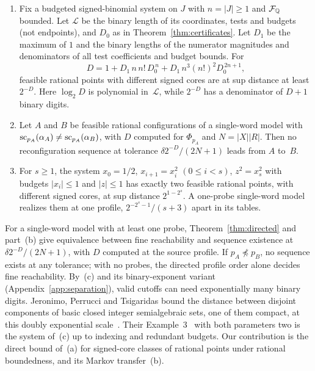 \begin{proposition}\label{prop:separation}
\begin{enumerate}
\item[(a)] Fix a budgeted signed-binomial system on $J$ with $n=|J|\ge1$
and $\mathcal F_{\mathbb{Q}}$ bounded. Let $\mathcal L$ be the binary length of its coordinates, tests
and budgets (not endpoints), and $D_0$ as in Theorem~\ref{thm:certificates}.
Let $D_1$ be the maximum of $1$ and the binary lengths of the numerator
magnitudes and denominators of all test coefficients and budget bounds.
For
\[
  D=1+D_1\,n\,n!\,D_0^{\,n}+D_1\,n^3(n!)^2D_0^{\,2n+1},
\]
feasible rational points with different signed cores are at sup distance
at least $2^{-D}$. Here $\log_2D$ is polynomial in~$\mathcal L$, while $2^{-D}$ has
a denominator of $D+1$ binary digits.
\item[(b)] Let $A$ and $B$ be feasible rational configurations of a
single-word model with $\operatorname{sc}_{p_A}(\alpha_A)\neq\operatorname{sc}_{p_A}(\alpha_B)$, with
$D$ computed for $\Phi_{p_A}$ and $N=|X||R|$. Then no reconfiguration
sequence at tolerance $\delta2^{-D}/(2N+1)$ leads from $A$ to~$B$.
\item[(c)] For $s\ge1$, the system $x_0=1/2$, $x_{i+1}=x_i^2$
$(0\le i<s)$, $z^2=x_s^2$ with budgets $|x_i|\le1$ and $|z|\le1$ has
exactly two feasible rational points, with different signed cores, at
sup distance $2^{1-2^s}$. A one-probe single-word model realizes them
at one profile, $2^{-2^s-1}/(s+3)$ apart in its tables.
\end{enumerate}
\end{proposition}

For a single-word model with at least one probe, Theorem~\ref{thm:directed}
and part~(b) give equivalence between fine reachability and sequence
existence at $\delta2^{-D}/(2N+1)$, with $D$ computed at the source
profile. If $p_A\npreceq p_B$, no sequence exists at any tolerance; with
no probes, the directed profile order alone decides fine reachability. By~(c) and its binary-exponent variant
(Appendix~\ref{app:separation}), valid cutoffs can need exponentially many
binary digits. Jeronimo,
Perrucci and Tsigaridas bound the distance between disjoint components of
basic closed integer semialgebraic sets, one of them compact, at this
doubly exponential scale~\cite[Theorem~1.2]{jeronimoperruccitsigaridas}.
Their Example~3~\cite{jeronimoperruccitsigaridas} with both parameters
two is the system of~(c) up to indexing and redundant budgets.
Our contribution is the direct bound of~(a) for signed-core classes of
rational points under rational boundedness, and its Markov transfer~(b).

